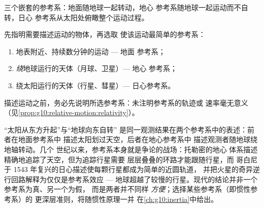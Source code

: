 \begin{omfigure}

{\small 三个嵌套的参考系：地面随地球一起转动，地心
参考系随地球一起运动而不自转，日心
参考系从太阳处俯瞰整个运动过程。}
\end{omfigure}

\begin{method}[选择参考系]\label{met:g10:relative-motion:choose}
先指明需要描述运动的物体，再选取
使该运动最简单的参考系：
\begin{enumerate}
  \item 地表附近、持续数分钟的运动 --- 地面
        参考系；
  \item \emph{绕}地球运行的天体（月球、卫星）--- 地心
        参考系；
  \item 绕太阳运行的天体（行星、彗星）--- 日心参考系。
\end{enumerate}
描述运动之前，务必先说明所选参考系：未注明参考系的轨迹或
速率毫无意义
（见\cref{prop:g10:relative-motion:relativity}）。
\end{method}

\begin{remark}\label{rem:g10:relative-motion:history}
“太阳从东方升起”与“地球向东自转”
是同一观测结果在两个参考系中的表述：前者在地面参考系中
描述太阳划过天空，后者在地心参考系中
描述观测者随地球绕地轴转动。几个
世纪以来，参考系本身就是争论的战场：托勒密的地心
体系描述精确地追踪了天空，但为追踪行星需要
层层叠叠的环路才能跟随行星，而
哥白尼于 1543 年复兴的日心描述使每颗行星都成为简单的近圆轨道，
并把火星的奇异逆行回路解释为仅仅是参考系效应 ---
地球超越了较慢的行星。现代的结论并非一个参考系为真、另一个为假，
而是两者并不同样
\emph{方便}；选择某些参考系（即惯性参考系）的
更深层准则，将随惯性原理一并
在\cref{ch:g10:inertia}中给出。
\end{remark}

